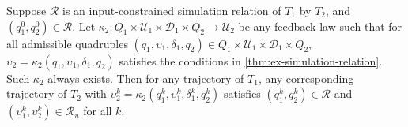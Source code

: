 \begin{lemma}
  \label{thm:ex-simulation-tracking}
  Suppose $\mathcal{R}$ is an input-constrained simulation relation of $T_{1}$ by $T_{2}$, %
  and $(q_{1}^{0}, q_{2}^{0}) \in \mathcal{R}$.
  Let $\kappa_{2}: Q_{1} \times \mathcal{U}_{1} \times \mathcal{D}_{1} \times Q_{2} \to \mathcal{U}_{2}$ be any feedback law such that for all admissible quadruples $(q_{1}, \upsilon_{1}, \delta_{1}, q_{2}) \in Q_{1} \times \mathcal{U}_{1} \times \mathcal{D}_{1} \times Q_{2}$, $\upsilon_{2} = \kappa_{2} (q_{1}, \upsilon_{1}, \delta_{1}, q_{2})$ satisfies the conditions in \cref{thm:ex-simulation-relation}.
  Such $\kappa_{2}$ %
  always exists.
  Then for any trajectory of $T_{1}$, %
  any corresponding trajectory of $T_{2}$ with $\upsilon_{2}^{k} = \kappa_{2} (q_{1}^{k}, \upsilon_{1}^{k}, \delta_{1}^{k}, q_{2}^{k})$ satisfies $(q_{1}^{k}, q_{2}^{k}) \in \mathcal{R}$ and $(\upsilon_{1}^{k}, \upsilon_{2}^{k}) \in \mathcal{R}_{u}$ for all $k$.
\end{lemma}

